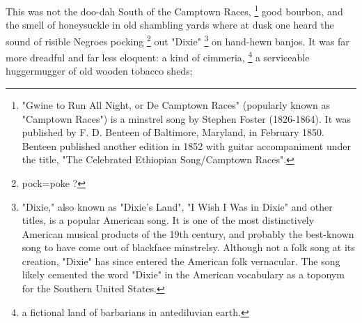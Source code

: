   This was not the doo-dah South of the Camptown Races, 
\footnote{ "Gwine to Run All Night, or De Camptown Races" (popularly known as
"Camptown Races") is a minstrel song by Stephen Foster (1826-1864). 
It was published by F. D. Benteen of Baltimore,
Maryland, in February 1850. Benteen published another edition in 1852 with
guitar accompaniment under the title, "The Celebrated Ethiopian Song/Camptown
Races".}
good bourbon, 
and the smell of honeysuckle 
in old shambling 
yards where at dusk one heard the sound of risible 
Negroes pocking 
\footnote{\textdbend pock=poke ?}
out "Dixie" 
\footnote{ "Dixie," also known as "Dixie's Land", "I Wish I Was in Dixie" and
other titles, is a popular American song. It is one of the most distinctively
American musical products of the 19th century, and probably the best-known
song to have come out of blackface minstrelsy. Although not a folk song at
its creation, "Dixie" has since entered the American folk vernacular. The song
likely cemented the word "Dixie" in the American vocabulary as a toponym for the
Southern United States.}
on hand-hewn 
banjos. 
It was far more dreadful and far less eloquent: a kind of cimmeria, 
\footnote{ \textdbend a fictional land of barbarians in antediluvian earth. }
a serviceable huggermugger
of old wooden tobacco sheds; 
